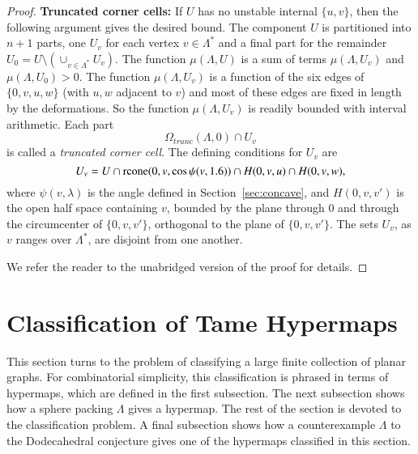 \documentclass{article} %
\begin{document}
\begin{proof}
\textbf {Truncated corner cells:}  If $U$ has no unstable
internal $\{u,v\}$, then the following argument gives the
desired bound.  The component $U$ is partitioned into $n+1$
parts, one $U_v$ for each vertex $v\in\Lambda^*$ and a final part
for the remainder $U_0 = U\setminus(\cup_{v\in\Lambda^*} U_v)$.
The function $\mu(\Lambda,U)$ is a sum of terms $\mu(\Lambda,U_v)$
and $\mu(\Lambda,U_0) >0$.  The function $\mu(\Lambda,U_v)$
is a function of the six edges of $\{0,v,u,w\}$ (with $u,w$
adjacent to $v$) and most of these edges are fixed in length
by the deformations.  So the function $\mu(\Lambda,U_v)$
is readily bounded with interval arithmetic.  Each part
$$\Omega_{trunc}(\Lambda,0)\cap U_v$$
is called a {\it truncated corner cell}.  The defining conditions
for $U_v$ are
  $$
  U_v = U \cap {\operatorname{rcone}}(0,v,\cos\psi(v,1.6)) \cap H(0,v,u) \cap H(0,v,w),
  $$
where $\psi(v,\lambda)$ is the angle defined in Section~\ref{sec:concave},
and $H(0,v,v')$ is the open half space containing $v$, bounded by
the plane through $0$ and through the circumcenter
of $\{0,v,v'\}$, orthogonal to the plane of $\{0,v,v'\}$.  The
sets $U_v$, as $v$ ranges over $\Lambda^*$, are disjoint from one
another.



We refer the reader to the unabridged version of the proof for details.
\end{proof}

\section{Classification of Tame Hypermaps}

This section turns to the problem of classifying a large finite collection
of planar graphs. For combinatorial simplicity, this classification is phrased
in terms of hypermaps, which are defined in the first subsection.
The next subsection shows how a sphere packing $\Lambda$ gives a hypermap.
The rest of the section is devoted to the classification problem.
A final subsection shows how a counterexample $\Lambda$ to the Dodecahedral
conjecture gives one of the hypermaps classified in this section.
\end{document}
